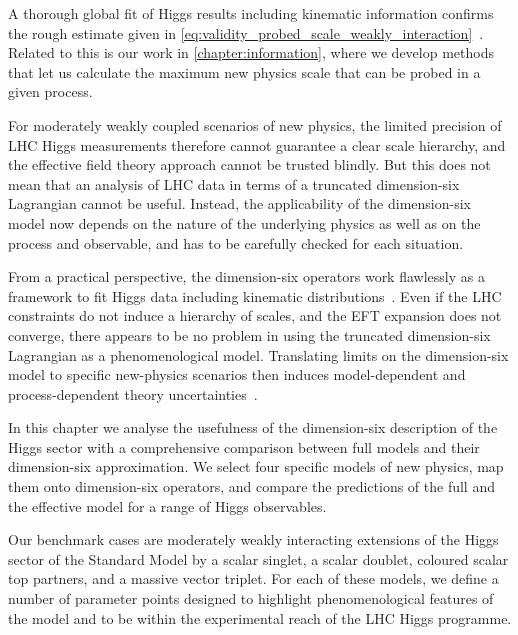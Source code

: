 A thorough global fit of Higgs results including kinematic information
confirms the rough estimate given in
\autoref{eq:validity_probed_scale_weakly_interaction}~\cite{Corbett:2015ksa}.
Related to this is our work in \autoref{chapter:information}, where we
develop methods that let us calculate the maximum new physics scale
that can be probed in a given process.

For moderately weakly coupled scenarios of new physics, the limited
precision of LHC Higgs measurements therefore cannot guarantee a clear
scale hierarchy, and the effective field theory approach cannot be
trusted blindly. But this does not mean that an analysis of LHC data
in terms of a truncated dimension-six Lagrangian cannot be
useful. Instead, the applicability of the dimension-six model now
depends on the nature of the underlying physics as well as on the
process and observable, and has to be carefully checked for each
situation.

From a practical perspective, the dimension-six operators work
flawlessly as a framework to fit Higgs data including kinematic
distributions~\cite{Corbett:2015ksa}. Even if the LHC constraints do
not induce a hierarchy of scales, and the EFT expansion does not
converge, there appears to be no problem in using the truncated
dimension-six Lagrangian as a phenomenological model. Translating
limits on the dimension-six model to specific new-physics scenarios
then induces model-dependent and process-dependent theory
uncertainties~\cite{Berthier:2015gja}.




\newparagraph
%
In this chapter we analyse the usefulness of the dimension-six
description of the Higgs sector with a comprehensive comparison
between full models and their dimension-six approximation. We select
four specific models of new physics, map them onto dimension-six
operators, and compare the predictions of the full and the effective
model for a range of Higgs observables.

Our benchmark cases are moderately weakly interacting extensions of
the Higgs sector of the Standard Model by a scalar singlet, a scalar
doublet, coloured scalar top partners, and a massive vector triplet.
For each of these models, we define a number of parameter points
designed to highlight phenomenological features of the model and to be
within the experimental reach of the LHC Higgs programme.

